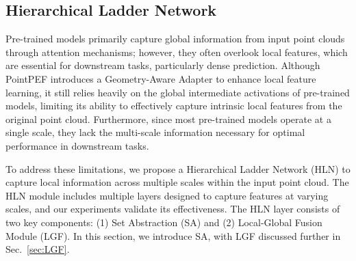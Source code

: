 

\subsection{Hierarchical Ladder Network}
\label{sec:HLN}
Pre-trained models primarily capture global information from input point clouds through attention mechanisms; however, they often overlook local features, which are essential for downstream tasks, particularly dense prediction. Although PointPEF introduces a Geometry-Aware Adapter to enhance local feature learning, it still relies heavily on the global intermediate activations of pre-trained models, limiting its ability to effectively capture intrinsic local features from the original point cloud. Furthermore, since most pre-trained models operate at a single scale, they lack the multi-scale information necessary for optimal performance in downstream tasks.

To address these limitations, we propose a Hierarchical Ladder Network (HLN) to capture local information across multiple scales within the input point cloud. The HLN module includes multiple layers designed to capture features at varying scales, and our experiments validate its effectiveness. The HLN layer consists of two key components: (1) Set Abstraction (SA) and (2) Local-Global Fusion Module (LGF). 
In this section, we introduce SA, with LGF discussed further in Sec.~\ref{sec:LGF}.

